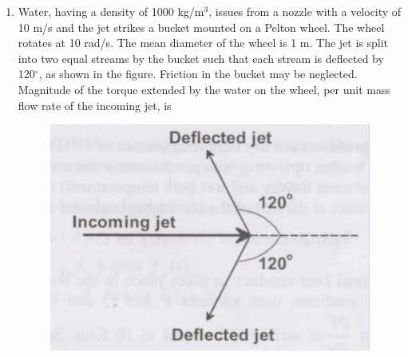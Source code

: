 \documentclass[journal,12pt,onecolumn]{IEEEtran}
\begin{document}
\begin{enumerate}
          \begin{enumerate}
          \end{enumerate}

    \item Water, having a density of 1000 kg/m$^3$, issues from a nozzle with a velocity of 10 m/s and the jet strikes a bucket mounted on a Pelton wheel. The wheel rotates at 10 rad/s. The mean diameter of the wheel is 1 m. The jet is split into two equal streams by the bucket such that each stream is deflected by 120$^\circ$, as shown in the figure. Friction in the bucket may be neglected. Magnitude of the torque extended by the water on the wheel, per unit mass flow rate of the incoming jet, is

          \begin{figure}[H]
              \centering
              \includegraphics[scale=0.3]{q51}
              \caption{}
              \label{q51}
          \end{figure}

          \begin{enumerate}
          \end{enumerate}


\end{enumerate}
\end{document}
